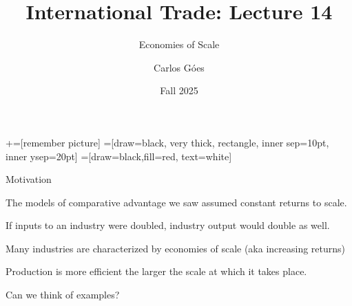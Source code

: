 \documentclass[notes,11pt, aspectratio=169, xcolor=table]{beamer}
\title[]{International Trade: Lecture 14}
\subtitle[]{Economies of Scale}
\author[Góes]
{Carlos Góes\inst{1}}
\date{Fall 2025}
\institute[GWU]{\inst{1} George Washington University }
\newenvironment{wideitemize}{\itemize\addtolength{\itemsep}{10pt}}{\enditemize}
\begin{document}
\newcommand\marktopleft[1]{%
    \tikz[overlay,remember picture] 
        \node (marker-#1-a) at (-.3em,.3em) {};%
}
\newcommand\markbottomright[2]{%
    \tikz[overlay,remember picture] 
        \node (marker-#1-b) at (0em,0em) {};%
}
+=[remember picture] 
 =[draw=black, very thick, rectangle, inner sep=10pt, inner ysep=20pt]
 =[draw=black,fill=red, text=white]















\frame{\titlepage}
\addtocounter{framenumber}{-1}




\begin{frame}{Motivation}
\begin{wideitemize}
    \item The models of comparative advantage we saw assumed constant returns to scale. 
    
    \item If inputs to an industry were doubled, industry output would double as well.
    
    \item Many industries
are characterized by economies of scale (aka increasing returns)

\item Production is more efficient the larger the scale at which it takes place.

\item Can we think of examples?
\end{wideitemize}
    
\end{frame}
\end{document}
